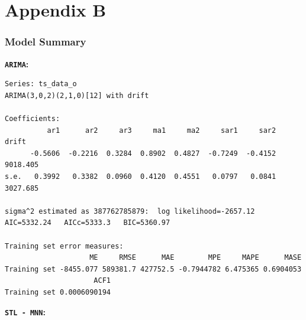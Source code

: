 \documentclass[openany]{book}
\begin{document}
\hypertarget{appendix-b}{%
\chapter*{Appendix B}\label{appendix-b}}

\hypertarget{model-b}{%
\subsection*{Model Summary}\label{model-b}}

\textbf{\texttt{ARIMA}:}

\begin{verbatim}
Series: ts_data_o 
ARIMA(3,0,2)(2,1,0)[12] with drift 

Coefficients:
          ar1      ar2     ar3     ma1     ma2     sar1     sar2     drift
      -0.5606  -0.2216  0.3284  0.8902  0.4827  -0.7249  -0.4152  9018.405
s.e.   0.3992   0.3382  0.0960  0.4120  0.4551   0.0797   0.0841  3027.685

sigma^2 estimated as 387762785879:  log likelihood=-2657.12
AIC=5332.24   AICc=5333.3   BIC=5360.97

Training set error measures:
                    ME     RMSE      MAE        MPE     MAPE      MASE
Training set -8455.077 589381.7 427752.5 -0.7944782 6.475365 0.6904053
                     ACF1
Training set 0.0006090194
\end{verbatim}

\textbf{\texttt{STL\ -\ MNN}:}
\end{document}
